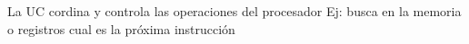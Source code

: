 \documentclass[preview]{standalone}
\begin{document}
La UC cordina y controla las operaciones del procesador                            Ej: busca en la memoria o registros cual es la próxima instrucción\\
\end{document}
